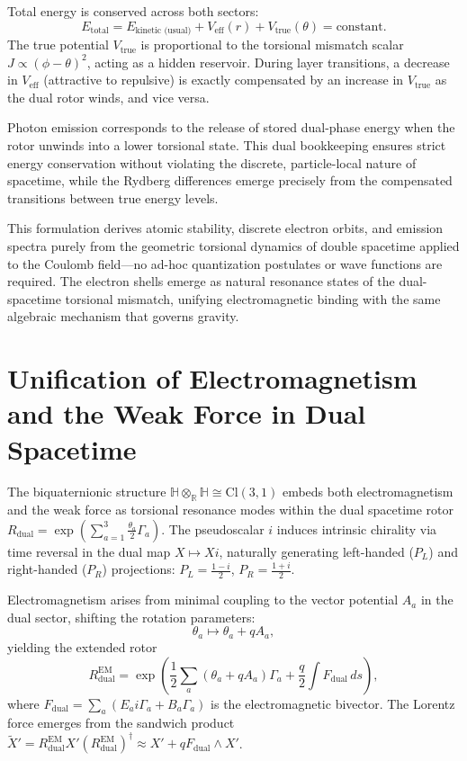 \documentclass[dvipdfmx,a4paper]{article}
\begin{document}
Total energy is conserved across both sectors:
\[
E_\text{total} = E_\text{kinetic (usual)} + V_\text{eff}(r) + V_\text{true}(\theta) = \text{constant}.
\]
The true potential \(V_\text{true}\) is proportional to the torsional mismatch scalar \(J \propto (\phi - \theta)^2\), acting as a hidden reservoir. During layer transitions, a decrease in \(V_\text{eff}\) (attractive to repulsive) is exactly compensated by an increase in \(V_\text{true}\) as the dual rotor winds, and vice versa.

Photon emission corresponds to the release of stored dual-phase energy when the rotor unwinds into a lower torsional state. This dual bookkeeping ensures strict energy conservation without violating the discrete, particle-local nature of spacetime, while the Rydberg differences emerge precisely from the compensated transitions between true energy levels.

This formulation derives atomic stability, discrete electron orbits, and emission spectra purely from the geometric torsional dynamics of double spacetime applied to the Coulomb field—no ad-hoc quantization postulates or wave functions are required. The electron shells emerge as natural resonance states of the dual-spacetime torsional mismatch, unifying electromagnetic binding with the same algebraic mechanism that governs gravity.

\section{Unification of Electromagnetism and the Weak Force in Dual Spacetime}
\label{sec:unification}

The biquaternionic structure $\mathbb{H} \otimes_{\mathbb{R}} \mathbb{H} \cong \mathrm{Cl}(3,1)$ embeds both electromagnetism and the weak force as torsional resonance modes within the dual spacetime rotor $R_{\text{dual}} = \exp\left( \sum_{a=1}^3 \frac{\theta_a}{2} \Gamma_a \right)$. The pseudoscalar $i$ induces intrinsic chirality via time reversal in the dual map $X \mapsto X i$, naturally generating left-handed ($P_L$) and right-handed ($P_R$) projections: $P_L = \frac{1 - i}{2}$, $P_R = \frac{1 + i}{2}$.

Electromagnetism arises from minimal coupling to the vector potential $A_a$ in the dual sector, shifting the rotation parameters:
\[
\theta_a \mapsto \theta_a + q A_a,
\]
yielding the extended rotor
\[
R_{\text{dual}}^{\text{EM}} = \exp\left( \frac{1}{2} \sum_a (\theta_a + q A_a) \Gamma_a + \frac{q}{2} \int F_{\text{dual}} \, ds \right),
\]
where $F_{\text{dual}} = \sum_a (E_a i \Gamma_a + B_a \Gamma_a)$ is the electromagnetic bivector. The Lorentz force emerges from the sandwich product $\tilde{X}' = R_{\text{dual}}^{\text{EM}} X' (R_{\text{dual}}^{\text{EM}})^\dagger \approx X' + q F_{\text{dual}} \wedge X'$.
\end{document}
